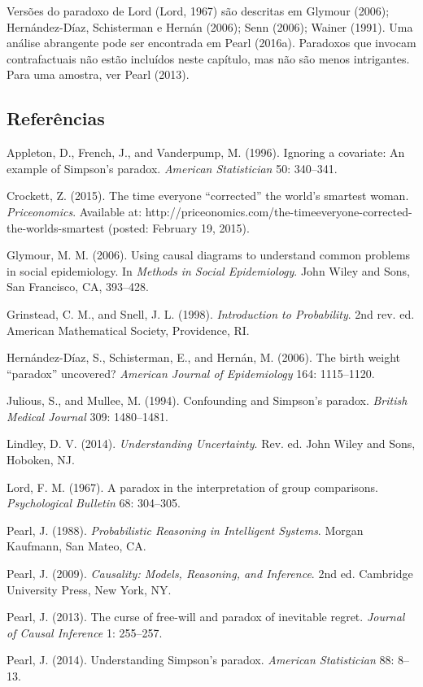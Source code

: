 \documentclass[11pt,a5paper,twoside]{book}
\begin{document}
Versões do paradoxo de Lord (Lord, 1967) são descritas em Glymour (2006); Hernández-Díaz, Schisterman e Hernán (2006); Senn (2006); Wainer (1991). Uma análise abrangente pode ser encontrada em Pearl (2016a). Paradoxos que invocam contrafactuais não estão incluídos neste capítulo, mas não são menos intrigantes. Para uma amostra, ver Pearl (2013).

\subsection{Referências}
Appleton, D., French, J., and Vanderpump, M. (1996). Ignoring a covariate: An example of Simpson’s paradox. \textit{American Statistician} 50: 340–341.

Crockett, Z. (2015). The time everyone “corrected” the world’s smartest woman. \textit{Priceonomics}. Available at: http://priceonomics.com/the-timeeveryone-corrected-the-worlds-smartest (posted: February 19, 2015).

Glymour, M. M. (2006). Using causal diagrams to understand common problems in social epidemiology. In \textit{Methods in Social Epidemiology}. John Wiley and Sons, San Francisco, CA, 393–428.

Grinstead, C. M., and Snell, J. L. (1998). \textit{Introduction to Probability}. 2nd rev. ed. American Mathematical Society, Providence, RI.

Hernández-Díaz, S., Schisterman, E., and Hernán, M. (2006). The birth weight “paradox” uncovered? \textit{American Journal of Epidemiology} 164: 1115–1120.

Julious, S., and Mullee, M. (1994). Confounding and Simpson’s paradox. \textit{British Medical Journal} 309: 1480–1481.

Lindley, D. V. (2014). \textit{Understanding Uncertainty}. Rev. ed. John Wiley and Sons, Hoboken, NJ.

Lord, F. M. (1967). A paradox in the interpretation of group comparisons. \textit{Psychological Bulletin} 68: 304–305.

Pearl, J. (1988). \textit{Probabilistic Reasoning in Intelligent Systems}. Morgan Kaufmann, San Mateo, CA.

Pearl, J. (2009). \textit{Causality: Models, Reasoning, and Inference}. 2nd ed. Cambridge University Press, New York, NY.

Pearl, J. (2013). The curse of free-will and paradox of inevitable regret. \textit{Journal of Causal Inference} 1: 255–257.

Pearl, J. (2014). Understanding Simpson’s paradox. \textit{American Statistician} 88: 8–13.
\end{document}
